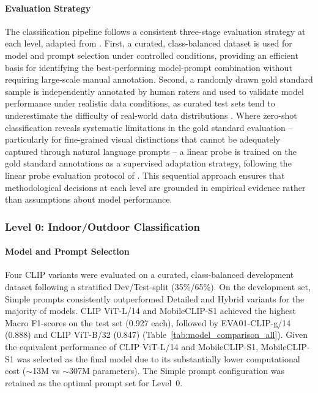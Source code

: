 \documentclass[hidelinks, 11pt]{article}
\begin{document}
\paragraph{Evaluation Strategy}

The classification pipeline follows a consistent three-stage evaluation strategy at each level, adapted from \citet{liao2025mapping}. First, a curated, class-balanced dataset is used for model and prompt selection under controlled conditions, providing an efficient basis for identifying the best-performing model-prompt combination without requiring large-scale manual annotation. Second, a randomly drawn gold standard sample is 
independently annotated by human raters and used to validate model 
performance under realistic data conditions, as curated test sets tend to underestimate the difficulty of real-world data distributions \citep{artstein_survey_2008}. Where zero-shot classification reveals systematic limitations in the gold standard evaluation -- particularly for fine-grained visual distinctions that cannot be adequately captured through natural language prompts \citep{radford2021learning} -- a linear probe is trained on the gold standard annotations as a supervised adaptation strategy, following the linear probe evaluation protocol of \citet{radford2021learning}. This sequential approach ensures that 
methodological decisions at each level are grounded in empirical evidence rather than assumptions about model performance.


\subsubsection{Level 0: Indoor/Outdoor Classification}
\label{sec:level0}

\paragraph{Model and Prompt Selection}

Four CLIP variants were evaluated on a curated, class-balanced development dataset following a stratified Dev/Test-split (35\%/65\%). On the development set, Simple prompts consistently outperformed Detailed and Hybrid variants for the majority of models. CLIP ViT-L/14 and MobileCLIP-S1 achieved the highest 
Macro F1-scores on the test set (0.927 each), followed by EVA01-CLIP-g/14 (0.888) and CLIP ViT-B/32 (0.847) (Table~\ref{tab:model_comparison_all}). 
Given the equivalent performance of CLIP ViT-L/14 and MobileCLIP-S1, MobileCLIP-S1 was selected as the final model due to its substantially lower computational cost ($\sim$13M vs $\sim$307M parameters). The Simple prompt configuration was retained as the optimal prompt set for Level~0.
\end{document}
